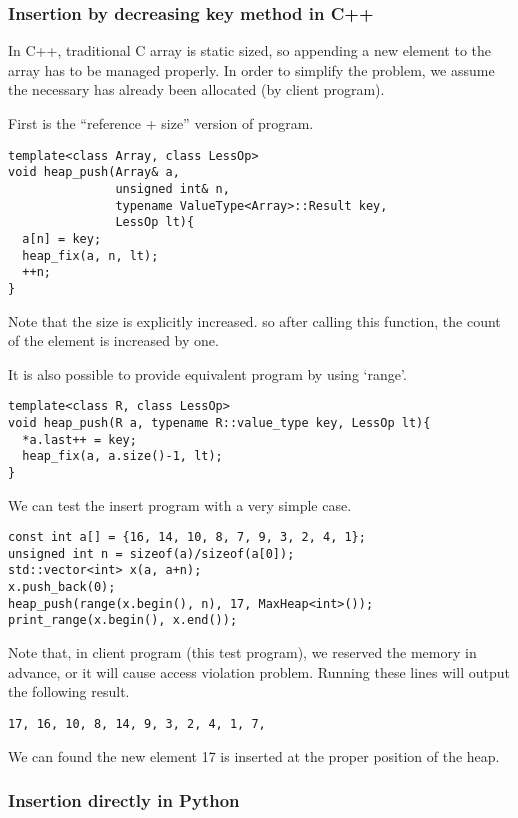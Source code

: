 \documentclass{article}
\begin{document}
\subsubsection*{Insertion by decreasing key method in C++}
In C++, traditional C array is static sized, so appending a new element
to the array has to be managed properly. In order to simplify the
problem, we assume the necessary has already been allocated (by
client program).

First is the ``reference + size'' version of program.

\lstset{language=C++}
\begin{lstlisting}
template<class Array, class LessOp>
void heap_push(Array& a, 
               unsigned int& n,
               typename ValueType<Array>::Result key,
               LessOp lt){
  a[n] = key; 
  heap_fix(a, n, lt);
  ++n;
}
\end{lstlisting}

Note that the size is explicitly increased. so after calling this
function, the count of the element is increased by one.

It is also possible to provide equivalent program by using `range'.

\begin{lstlisting}
template<class R, class LessOp>
void heap_push(R a, typename R::value_type key, LessOp lt){
  *a.last++ = key;
  heap_fix(a, a.size()-1, lt);
}
\end{lstlisting}

We can test the insert program with a very simple case.

\begin{lstlisting}
const int a[] = {16, 14, 10, 8, 7, 9, 3, 2, 4, 1};
unsigned int n = sizeof(a)/sizeof(a[0]);
std::vector<int> x(a, a+n);
x.push_back(0);
heap_push(range(x.begin(), n), 17, MaxHeap<int>());
print_range(x.begin(), x.end());
\end{lstlisting}

Note that, in client program (this test program), we
reserved the memory in advance, or it will cause
access violation problem. 
Running these lines will output the following result.

\begin{verbatim}
17, 16, 10, 8, 14, 9, 3, 2, 4, 1, 7,
\end{verbatim}

We can found the new element 17 is inserted at the proper
position of the heap.

\subsubsection*{Insertion directly in Python}
\end{document}
